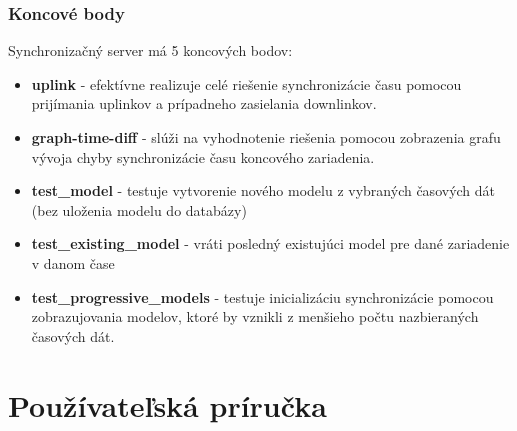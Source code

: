 \subsubsection{Koncové body}

Synchronizačný server má 5 koncových bodov:

\begin{itemize}
    \item \textbf{uplink} - efektívne realizuje celé riešenie synchronizácie času pomocou prijímania uplinkov a prípadneho zasielania downlinkov.
    \item \textbf{graph-time-diff} -  slúži na vyhodnotenie riešenia pomocou zobrazenia grafu vývoja chyby synchronizácie času koncového zariadenia.
    \item \textbf{test_model} - testuje vytvorenie nového modelu z vybraných časových dát (bez uloženia modelu do databázy)
    \item \textbf{test_existing_model} - vráti posledný existujúci model pre dané zariadenie v danom čase
    \item \textbf{test_progressive_models} - testuje inicializáciu synchronizácie pomocou zobrazujovania modelov, ktoré by vznikli z menšieho počtu nazbieraných časových dát.
\end{itemize}




\section{Používateľská príručka}






